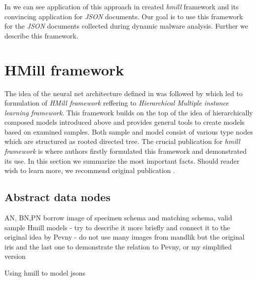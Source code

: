 In \cite{Mandlik2020} we can see application of this approach in created \emph{hmill} framework and its convincing application for \emph{JSON} documents. Our goal is to use this framework for the \emph{JSON} documents collected during dynamic malware analysis. Further we describe this framework.







\section{HMill framework}
The idea of the neural net architecture defined in \cite{Pevny2016a} was followed by \cite{Mandlik2020} which led to formulation of \emph{HMill framework} reffering to \emph{Hierarchical Multiple instance learning framework}. This framework builds on the top of the idea of hierarchically composed models introduced above and provides general tools to create models based on examined samples. Both sample and model consist of various type nodes which are structured as rooted directed tree. The crucial publication for \emph{hmill framework} is \cite{Mandlik2020} where authors firstly formulated this framework and demonstrated its use. In this section we summarize the most important facts. Should reader wish to learn more, we recommend original publication \cite{Mandlik2020}.

\subsection{Abstract data nodes}
AN, BN,PN
borrow image of specimen
schema and matching schema, valid sample
Hmill models - try to describe it more briefly and connect it to the original idea by Pevny - do not use many images from mandlik but the original iris and the last one to demonstrate the relation to Pevny, or my simplified version

Using hmill to model jsons

